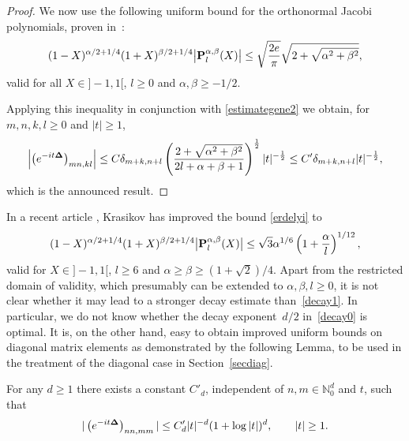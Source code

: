 \documentclass[pdftex]{sigma}
\begin{document}
\begin{proof}
We now use the following uniform bound for the orthonormal Jacobi polynomials,
proven in~\cite{erdel}:
\begin{gather}\label{erdelyi}
(1-X)^{\alpha/2+1/4}
(1+X)^{\beta/2+1/4}\big|{\bf P}_l^{\alpha,\beta}(X)\big| \leq \sqrt{\frac{2 e}{\pi}}\sqrt{2+
\sqrt{\alpha^2+\beta^2}} ,
\end{gather}
valid for all $X\in]-1,1[$, $l\geq 0 $ and
$\alpha, \beta\geq-1/2$.

Applying this inequality in conjunction with \eqref{estimategene2} we
obtain, for $m,n,k,l\geq 0$ and   $|t|\geq 1$,
\begin{gather*}%
\left|\left(e^{-it{\bf\Delta}}\right)_{mn,kl}\right|
 \leq C \delta_{m+k,n+l}
\left(\frac{2+
\sqrt{\alpha^2+\beta^2}}
{2l+\alpha +\beta +1}\right)^{\frac 12}
|t|^{-\frac 12}\leq C' \delta_{m+k,n+l} |t|^{-\frac 12} ,
\end{gather*}
which is the announced result.
\end{proof}

In a recent article \cite{Krasikov}, Krasikov has improved the bound
\eqref{erdelyi} to
\begin{gather*}%
(1-X)^{\alpha/2+1/4}
(1+X)^{\beta/2+1/4}\big|{\bf P}_l^{\alpha,\beta}(X)\big| \leq \sqrt 3
 \alpha^{1/6}\left(1+\frac\alpha l\right)^{1/12} ,
\end{gather*}
valid for $X\in]-1,1[$, $l\geq 6$ and
$\alpha\geq \beta\geq(1+\sqrt2)/4$. Apart from the restricted domain
of validity, which presumably can be extended to $\alpha, \beta, l\geq 0$,
it is not clear whether it may lead to a stronger decay estimate than~\eqref{decay1}. In particular, we do not know whether the decay exponent~$d/2$ in~\eqref{decay0} is optimal.
It is, on the other hand, easy to obtain improved uniform bounds on
diagonal matrix elements as demonstrated by the following
Lemma, to be used in the treatment of the diagonal case in
Section~\ref{secdiag}.

\begin{lemma}
\label{logestimate}
For any $d\geq 1$ there exists a constant $C'_d$, independent of $n,m
\in\mathbb N_0^d$ and
$t$, such that
\begin{gather}\label{decay00}
|\left(e^{-it{\bf\Delta}}\right)_{nn,mm}| \leq  C'_d |t|^{-d}(1+\log
|t|)^d ,\qquad |t|\geq 1 .
\end{gather}
\end{lemma}
\end{document}
